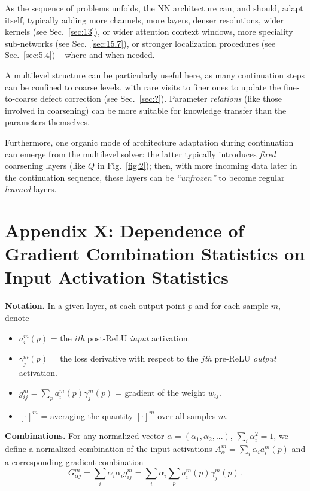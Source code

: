 \documentclass{article} %
\begin{document}
As the sequence of problems unfolds, the NN architecture can, and should, adapt itself, typically adding more channels, more layers, denser resolutions, wider kernels (see Sec.~\ref{sec:13}), or wider attention context windows, more speciality sub-networks (see Sec.~\ref{sec:15.7}), or stronger localization procedures (see Sec.~\ref{sec:5.4}) -- where and when needed.

A multilevel structure can be particularly useful here, as many continuation steps can be confined to coarse levels, with rare visits to finer ones to update the fine-to-coarse defect correction (see Sec.~\ref{sec:?}). Parameter {\it relations} (like those involved in coarsening) can be more suitable for knowledge transfer than the parameters themselves.

Furthermore, one organic mode of architecture adaptation during continuation can emerge from the multilevel solver: the latter typically introduces {\it fixed} coarsening layers (like $Q$ in Fig.~\ref{fig:2}); then, with more incoming data later in the continuation sequence, these layers can be {\it ``unfrozen''} to become regular {\it learned} layers.

\newpage
\section{Appendix X: Dependence of Gradient Combination Statistics on Input Activation Statistics}
\label{sec:x}

{\bf Notation.} In a given layer, at each output point $p$ and for each sample $m$, denote
\begin{itemize}
    \item $a^m_i(p)$ = the $i${\it th} post-ReLU {\it input} activation.
    \item $\gamma^m_j(p)$ = the loss derivative with respect to the $j${\it th} pre-ReLU
    {\it output} activation.
    \item $g^m_{ij} = \sum_p a^m_i(p) \gamma^m_j(p)$ = gradient of the weight $w_{ij}$.
    \item $\overline{[\cdot]^m}$ = averaging the quantity $[\cdot]^m$ over all samples $m$.
\end{itemize}

{\bf Combinations.} For any normalized vector $\alpha = (\alpha_1, \alpha_2, ...)$, $\sum_i \alpha_i^2 = 1$, we define a normalized combination of the input activations $A^m_{\alpha} = \sum_i \alpha_i a^m_i(p)$ and a corresponding gradient combination
$$ G^m_{\alpha j} = \sum_i \alpha_i \alpha_i g^m_{ij} = \sum_i \alpha_i \sum_p a^m_i(p) \gamma^m_j(p)\,.$$
\end{document}
